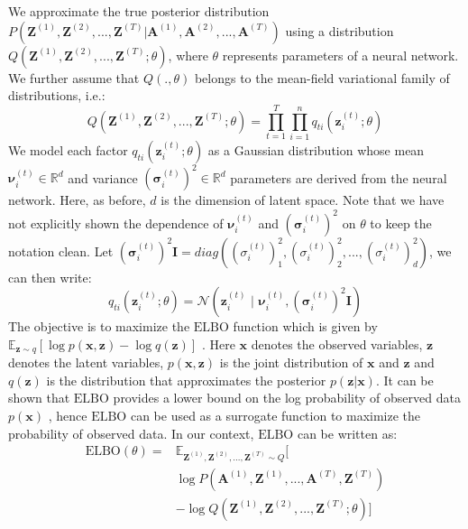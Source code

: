 \documentclass[letterpaper]{article} %
\begin{document}
We approximate the true posterior distribution $P(\mathbf{Z}^{(1)}, \mathbf{Z}^{(2)}, ..., \mathbf{Z}^{(T)} | \mathbf{A}^{(1)}, \mathbf{A}^{(2)}, ..., \mathbf{A}^{(T)})$ using a distribution $Q(\mathbf{Z}^{(1)}, \mathbf{Z}^{(2)}, ..., \mathbf{Z}^{(T)}; \theta)$, where $\theta$ represents parameters of a neural network. We further assume that $Q(., \theta)$ belongs to the mean-field variational family of distributions, i.e.:
\begin{equation}
    \label{eq:meanfield}
    Q(\mathbf{Z}^{(1)}, \mathbf{Z}^{(2)}, ..., \mathbf{Z}^{(T)}; \theta) = \prod_{t = 1}^{T} \prod_{i=1}^{{n}} q_{ti}(\mathbf{z}_i^{(t)}; \theta)
\end{equation}
We model each factor $q_{ti}(\mathbf{z}_i^{(t)}; \theta)$ as a Gaussian distribution whose mean $\bm{\nu}_i^{(t)} \in \mathbb{R}^d$ and variance ${(\bm{\sigma}_i^{(t)})^2} \in \mathbb{R}^d$ parameters are derived from the neural network. Here, as before, $d$ is the dimension of latent space. Note that we have not explicitly shown the dependence of $\bm{\nu}_i^{(t)}$ and ${(\bm{\sigma}_i^{(t)})^2}$ on $\theta$ to keep the notation clean. Let ${(\bm{\sigma}_i^{(t)})^2} \mathbf{I} = diag((\sigma_i^{(t)})_1^2, (\sigma_i^{(t)})_2^2, ..., (\sigma_i^{(t)})_d^2)$, we can then write:
\begin{equation}
    \label{eq:meanfieldfactordefinition}
    q_{ti}(\mathbf{z}_i^{(t)}; \theta) = \mathcal{N}(\mathbf{z}_i^{(t)} \,\,|\,\, \bm{\nu}_i^{(t)},  {(\bm{\sigma}_i^{(t)})^2} \mathbf{I})
\end{equation}
The objective is to maximize the $\mathrm{ELBO}$ function which is given by $\mathbb{E}_{\mathbf{z} \sim q}[\log p(\mathbf{x}, \mathbf{z}) - \log q(\mathbf{z})]$ \cite{BleiEtAl:2017:VariationalInferenceAReviewForStatisticians}. Here $\mathbf{x}$ denotes the observed variables, $\mathbf{z}$ denotes the latent variables, $p(\mathbf{x}, \mathbf{z})$ is the joint distribution of $\mathbf{x}$ and $\mathbf{z}$ and $q(\mathbf{z})$ is the distribution that approximates the posterior $p(\mathbf{z}|\mathbf{x})$. It can be shown that $\mathrm{ELBO}$ provides a lower bound on the log probability of observed data $p(\mathbf{x})$ \cite{KingmaEtAl:2013:AutoEncodingVariationalBayes}, hence $\mathrm{ELBO}$ can be used as a surrogate function to maximize the probability of observed data. In our context, $\mathrm{ELBO}$ can be written as:
\begin{equation}
    \label{eq:elbo}
    \begin{split}
        \mathrm{ELBO}(\theta) = &\mathbb{E}_{\mathbf{Z}^{(1)}, \mathbf{Z}^{(2)}, ..., \mathbf{Z}^{(T)} \sim Q}[ \\ 
        &\log P(\mathbf{A}^{(1)}, \mathbf{Z}^{(1)}, ..., \mathbf{A}^{(T)}, \mathbf{Z}^{(T)}) \\
        &- \log Q(\mathbf{Z}^{(1)}, \mathbf{Z}^{(2)}, ..., \mathbf{Z}^{(T)}; \theta)]    
    \end{split}
\end{equation}
\end{document}
